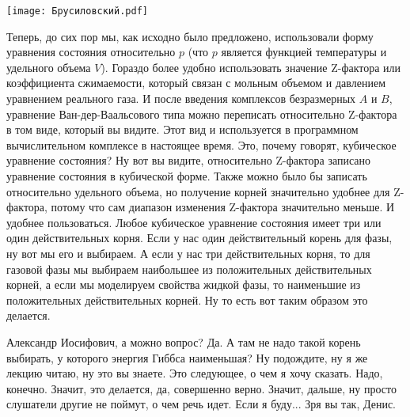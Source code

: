 \documentclass[main.tex]{subfiles}
\begin{document}
\begin{center}
\texttt{[image: Брусиловский.pdf]}
\end{center}

Теперь, до сих пор мы, как исходно было предложено, использовали форму уравнения состояния относительно $p$ (что $p$ является функцией температуры и удельного объема $V$).
Гораздо более удобно использовать значение Z-фактора или коэффициента сжимаемости, который связан с мольным объемом и давлением уравнением реального газа.
И после введения комплексов безразмерных $A$ и $B$, уравнение Ван-дер-Ваальсового типа можно переписать относительно Z-фактора в том виде, который вы видите.
Этот вид и используется в программном вычислительном комплексе в настоящее время.
Это, почему говорят, кубическое уравнение состояния?
Ну вот вы видите, относительно Z-фактора записано уравнение состояния в кубической форме.
Также можно было бы записать относительно удельного объема, но получение корней значительно удобнее для Z-фактора, потому что сам диапазон изменения Z-фактора значительно меньше.
И удобнее пользоваться.
Любое кубическое уравнение состояния имеет три или один действительных корня.
Если у нас один действительный корень для фазы, ну вот мы его и выбираем.
А если у нас три действительных корня, то для газовой фазы мы выбираем наибольшее из положительных действительных корней, а если мы моделируем свойства жидкой фазы, то наименьшие из положительных действительных корней.
Ну то есть вот таким образом это делается.

Александр Иосифович, а можно вопрос?
Да.
А там не надо такой корень выбирать, у которого энергия Гиббса наименьшая?
Ну подождите, ну я же лекцию читаю, ну это вы знаете.
Это следующее, о чем я хочу сказать.
Надо, конечно.
Значит, это делается, да, совершенно верно.
Значит, дальше, ну просто слушатели другие не поймут, о чем речь идет.
Если я буду... Зря вы так, Денис.
\end{document}
